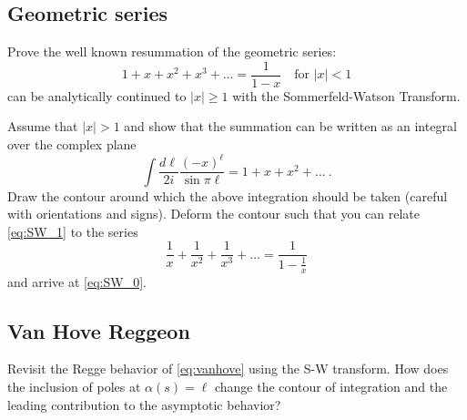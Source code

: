
\subsection{Geometric series}

Prove the well known resummation of the geometric series:
    \begin{equation}\label{eq:SW_0}
         1 + x + x^2 + x^3 + \dots =  \frac{1}{1-x} \quad \text{for } |x| < 1
    \end{equation}
can be analytically continued to $|x| \geq 1$ with the Sommerfeld-Watson Transform.

Assume that $|x| > 1$ and show that the summation can be written as an integral over the complex plane
    \begin{equation}
        \label{eq:SW_1}
         \int \frac{d\ell}{2i} \frac{(-x)^\ell}{\sin \pi \ell} = 1 + x + x^2 + \dots ~.
    \end{equation}
Draw the contour around which the above integration should be taken (careful with orientations and signs).
Deform the contour such that you can relate \cref{eq:SW_1} to the series
    \begin{equation}
        \frac{1}{x} + \frac{1}{x^2} + \frac{1}{x^3} + \dots = \frac{1}{1- \frac{1}{x}}
    \end{equation}
and arrive at \cref{eq:SW_0}.

\subsection{Van Hove Reggeon}
Revisit the Regge behavior of \cref{eq:vanhove} using the S-W transform. How does the inclusion of poles at $\alpha(s) = \ell$ change the contour of integration and the leading contribution to the asymptotic behavior?
